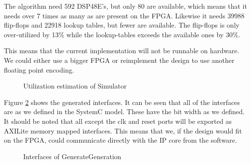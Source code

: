 The algorithm need 592 DSP48E's, but only 80 are available, which means that it needs over 7 times as many as are present on the FPGA. Likewise it needs 39988 flip-flops and 22918 lookup tables, but fewer are available. The flip-flops is only over-utilized by 13\% while the lookup-tables exceeds the available ones by 30\%. 

This means that the current implementation will not be runnable on hardware. We could either use a bigger FPGA or reimplement the design to use another floating point encoding.

\begin{figure}[h!]
	\centering
	\caption{Utilization estimation of Simulator}
	\label{fig:simutilizationestimates}
\end{figure}
Figure \ref{fig:siminterface} shows the generated interfaces. It can be seen that all of the interfaces are as we defined in the SystemC model. These have the bit width as we defined. It should be noted that all except the clk and reset ports will be exported as AXILite memory mapped interfaces. This means that we, if the design would fit on the FPGA, could communicate directly with the IP core from the software.

\begin{figure}[h!]
	\centering
	\caption{Interfaces of GenerateGeneration}
	\label{fig:siminterface}
\end{figure}
